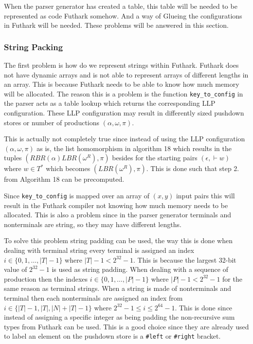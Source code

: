 When the parser generator has created a table, this table will be needed to be represented as code Futhark somehow. And a way of Glueing the configurations in Futhark will be needed. These problems will be answered in this section.
\subsubsection{String Packing}
The first problem is how do we represent strings within Futhark. Futhark does not have dynamic arrays and is not able to represent arrays of different lengths in an array. This is because Futhark needs to be able to know how much memory will be allocated. The reason this is a problem is the function \lstinline|key_to_config| in the parser acts as a table lookup which returns the corresponding LLP configuration. These LLP configuration may result in differently sized pushdown stores or number of productions $(\alpha, \omega, \pi)$.

This is actually not completely true since instead of using the LLP configuration $(\alpha, \omega, \pi)$ as is, the list homomorphism in algorithm 18 \cite[18]{Vagner2007} which results in the tuples $(RBR(\alpha)LBR(\omega^R), \pi)$ besides for the starting pairs $(\epsilon, \vdash w)$ where $w \in T^*$ which becomes $(LBR(\omega^R), \pi)$. This is done such that step 2. from Algorithm 18 \cite[18]{Vagner2007} can be precomputed.

Since \lstinline|key_to_config| is mapped over an array of $(x,y)$ input pairs this will result in the Futhark compiler not knowing how much memory needs to be allocated. This is also a problem since in the parser generator terminals and nonterminals are string, so they may have different lengths.

To solve this problem string padding can be used, the way this is done when dealing with terminal string every terminal is assigned an index $i \in \{0, 1, \dots, |T| - 1\}$ where $|T| - 1 < 2^{32} - 1$. This is because the largest 32-bit value of $2^{32} - 1$ is used as string padding. When dealing with a sequence of production then the indexes $i \in \{0, 1, \dots, |P| - 1\}$ where $|P| - 1 < 2^{32} - 1$ for the same reason as terminal strings. When a string is made of nonterminals and terminal then each nonterminals are assigned an index from $i \in \{|T| - 1, |T|, |N| + |T| - 1\}$ where $2^{32} - 1 \leq i \leq 2^{64} - 1$. This is done since instead of assigning a specific integer as being padding the non-recursive sum types from Futhark can be used. This is a good choice since they are already used to label an element on the pushdown store is a \lstinline|#left| or \lstinline|#right| bracket.

